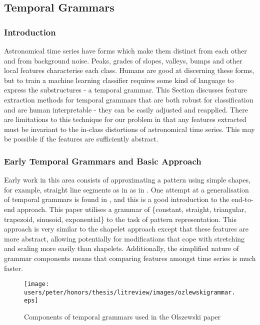 	
	\subsection{Temporal Grammars}
	\subsubsection{Introduction}
	Astronomical time series have forms which make them distinct from each other and from background noise. Peaks, grades of slopes, valleys, bumps and other local features characterise each class. Humans are good at discerning these forms, but to train a machine learning classifier requires some kind of language to express the substructures - a temporal grammar. This Section discusses feature extraction methods for temporal grammars that are both robust for classification and are human interpretable - they can be easily adjusted and reapplied. There are limitations to this technique for our problem in that any features extracted must be invariant to the in-class distortions of astronomical time series. This may be possible if the features are sufficiently abstract.
	\subsubsection{Early Temporal Grammars and Basic Approach}
	Early work in this area consists of approximating a pattern using simple shapes, for example, straight line segments as in as in \citep{keogh1998enhanced}. One attempt at a generalisation of temporal grammars is found in \citep{olszewski2001generalized}, and this is a good introduction to the end-to-end approach. This paper utilises a grammar of \{constant, straight, triangular, trapezoid, sinusoid, exponential\} to the task of pattern representation. This approach is very similar to the shapelet approach except that these features are more abstract, allowing potentially for modifications that cope with stretching and scaling more easily than shapelets. Additionally, the simplified nature of grammar components means that comparing features amongst time series is much faster. 
	\begin{figure}[ht!]
	\centering
	\texttt{[image: users/peter/honors/thesis/litreview/images/ozlewskigrammar.eps]}
	\caption{Components of temporal grammars used in the Olszewski paper}
	\label{oslewskigrammar}
	\end{figure}
	
